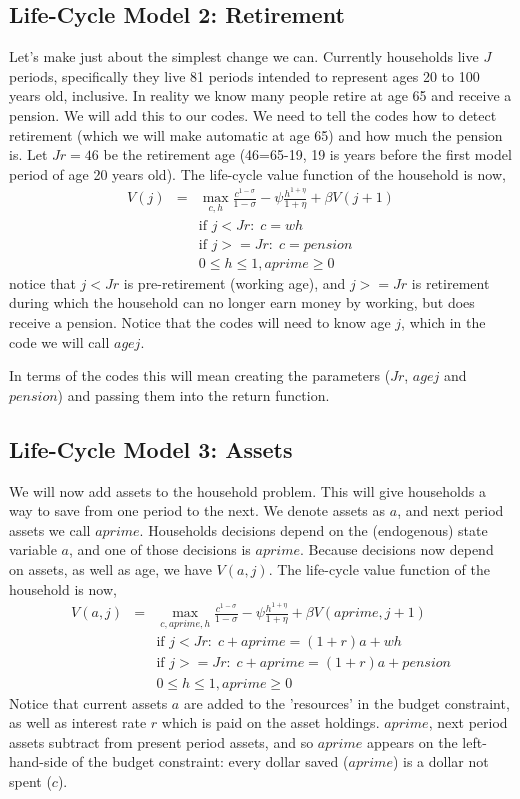 \subsection{Life-Cycle Model 2: Retirement}
Let's make just about the simplest change we can. Currently households live $J$ periods, specifically they live 81 periods intended to represent ages 20 to 100 years old, inclusive. In reality we know many people retire at age 65 and receive a pension. We will add this to our codes. We need to tell the codes how to detect retirement (which we will make automatic at age 65) and how much the pension is. Let $Jr=46$ be the retirement age (46=65-19, 19 is years before the first model period of age 20 years old). The life-cycle value function of the household is now,
\begin{eqnarray*}
 V(j)&=& \max_{c,h} \frac{c^{1-\sigma}}{1-\sigma} - \psi \frac{h^{1+\eta}}{1+\eta}  + \beta V(j+1) \\
&& \text{if }j<Jr: \; c=w h \\
&& \text{if }j>=Jr: \; c= pension\\
&& 0\leq h \leq 1, aprime\geq 0
\end{eqnarray*}
notice that $j<Jr$ is pre-retirement (working age), and $j>=Jr$ is retirement during which the household can no longer earn money by working, but does receive a pension. Notice that the codes will need to know age $j$, which in the code we will call $agej$.

In terms of the codes this will mean creating the parameters ($Jr$, $agej$ and $pension$) and passing them into the return function.

\subsection{Life-Cycle Model 3: Assets}
We will now add assets to the household problem. This will give households a way to save from one period to the next. We denote assets as $a$, and next period assets we call $aprime$. Households decisions depend on the (endogenous) state variable $a$, and one of those decisions is $aprime$. Because decisions now depend on assets, as well as age, we have $V(a,j)$. The life-cycle value function of the household is now,
\begin{eqnarray*}
 V(a,j)&=& \max_{c,aprime,h} \frac{c^{1-\sigma}}{1-\sigma} - \psi \frac{h^{1+\eta}}{1+\eta}  + \beta V(aprime,j+1) \\
&& \text{if }j<Jr: \; c+aprime=(1+r)a+w h \\
&& \text{if }j>=Jr: \; c+aprime=(1+r)a +pension\\
&& 0\leq h \leq 1, aprime\geq 0
\end{eqnarray*}
Notice that current assets $a$ are added to the 'resources' in the budget constraint, as well as interest rate $r$ which is paid on the asset holdings. $aprime$, next period assets subtract from present period assets, and so $aprime$ appears on the left-hand-side of the budget constraint: every dollar saved ($aprime$) is a dollar not spent ($c$).

